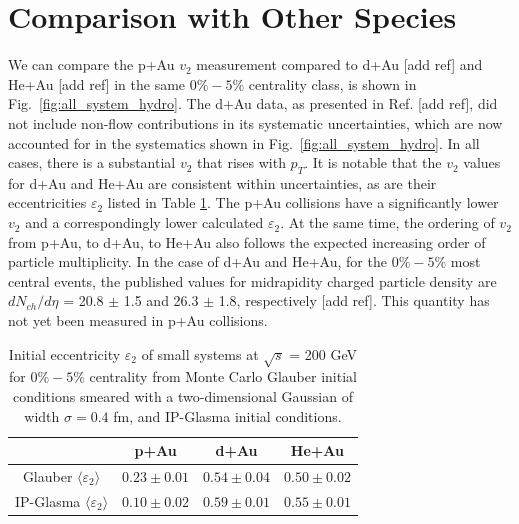 \section{Comparison with Other Species}
We can compare the p+Au $v_2$ measurement compared to d+Au
[add ref] %
and He+Au
[add ref]
in the same $0\%-5\%$ centrality class, is shown in Fig.~\ref{fig:all_system_hydro}. The d+Au data, as presented in Ref.
[add ref], did not include non-flow contributions in its systematic uncertainties, which are now accounted for in the systematics shown in Fig.~\ref{fig:all_system_hydro}. In all cases, there is a substantial $v_2$ that rises with $p_T$. It is notable that the $v_2$ values for d+Au and He+Au are consistent within uncertainties, as are their eccentricities $\varepsilon_2$ listed in Table \ref{table_geometry_glasma}. The p+Au collisions have a significantly lower $v_2$ and a correspondingly lower calculated $\varepsilon_2$. At the same time, the ordering of $v_2$ from p+Au, to d+Au, to He+Au also follows the expected increasing order of particle multiplicity. In the case of d+Au and He+Au, for the $0\%-5\%$ most central events, the published values for midrapidity charged particle density are $dN_{ch}/d\eta$ = 20.8 $\pm$ 1.5 and 26.3 $\pm$ 1.8, respectively
[add ref]. This quantity has not yet been measured in p+Au collisions.
\begin{table}[h!]
\caption{Initial eccentricity $\varepsilon_2$ of small systems at $\sqrt{s}$ = 200 GeV for $0\%-5\%$ centrality from Monte Carlo Glauber initial conditions smeared with a two-dimensional Gaussian of width $\sigma=0.4$ fm, and IP-Glasma initial conditions.}
\begin{tabular}{c c c c}
\label{table_geometry_glasma}
 & p+Au & d+Au & He+Au \\ \hline
 Glauber $\langle \varepsilon_2 \rangle$ & $0.23\pm 0.01$ & $0.54\pm 0.04$ & $0.50\pm 0.02$ \\
 IP-Glasma $\langle \varepsilon_2 \rangle$ & $0.10\pm 0.02$ & $0.59\pm 0.01$ & $0.55\pm 0.01$ \\
\end{tabular}
\end{table}

